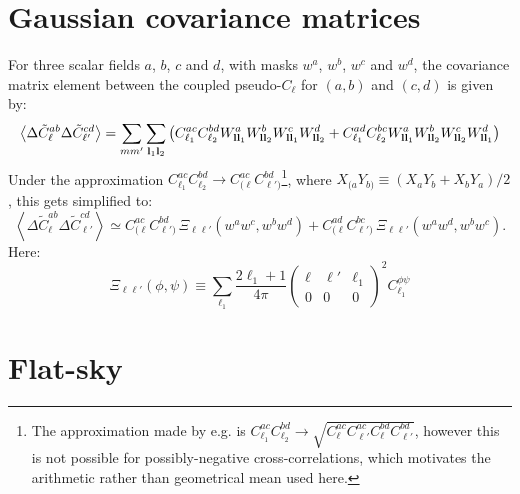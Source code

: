 \documentclass[a4paper,10pt]{article}
\newcommand{\wtj}[6]{\left(\begin{array}{ccc} #1 & #2 & #3\\#4 & #5 & #6\end{array} \right)}
\begin{document}
\section{Gaussian covariance matrices}
  For three scalar fields $a$, $b$, $c$ and $d$, with masks $w^a$, $w^b$, $w^c$ and $w^d$, the covariance matrix element between the coupled pseudo-$C_\ell$ for $(a,b)$ and $(c,d)$ is given by:
  \begin{equation}
    \left\langle\Delta\tilde{C}^{ab}_\ell\Delta\tilde{C}^{cd}_{\ell'}\right\rangle=\sum_{mm'}\sum_{{\bf l}_1{\bf l}_2}\left(C^{ac}_{\ell_1}C^{bd}_{\ell_2}W^a_{{\bf l}{\bf l}_1}W^b_{{\bf l}{\bf l}_2}W^c_{{\bf l}{\bf l}_1}W^d_{{\bf l}{\bf l}_2}+C^{ad}_{\ell_1}C^{bc}_{\ell_2}W^a_{{\bf l}{\bf l}_1}W^b_{{\bf l}{\bf l}_2}W^c_{{\bf l}{\bf l}_2}W^d_{{\bf l}{\bf l}_1}\right)
  \end{equation}
  Under the approximation $C^{ac}_{\ell_1}C^{bd}_{\ell_2}\rightarrow C^{ac}_{(\ell}C^{bd}_{\ell')}$\footnote{The approximation made by e.g. \cite{2004MNRAS.349..603E,2005MNRAS.360.1262B} is $C^{ac}_{\ell_1}C^{bd}_{\ell_2}\rightarrow \sqrt{C^{ac}_{\ell}C^{ac}_{\ell'}C^{bd}_{\ell}C^{bd}_{\ell'}}$, however this is not possible for possibly-negative cross-correlations, which motivates the arithmetic rather than geometrical mean used here.}, where $X_{(a}Y_{b)}\equiv(X_aY_b+X_bY_a)/2$, this gets simplified to:
  \begin{equation}
    \left\langle\Delta\tilde{C}^{ab}_\ell\Delta\tilde{C}^{cd}_{\ell'}\right\rangle\simeq
    C^{ac}_{(\ell}C^{bd}_{\ell')}\,\Xi_{\ell\ell'}(w^aw^c,w^bw^d)+C^{ad}_{(\ell}C^{bc}_{\ell')}\,\Xi_{\ell\ell'}(w^aw^d,w^bw^c).
  \end{equation}
  Here:
  \begin{equation}
    \Xi_{\ell\ell'}(\phi,\psi)\equiv\sum_{\ell_1}\frac{2\ell_1+1}{4\pi}\wtj{\ell}{\ell'}{\ell_1}{0}{0}{0}^2C^{\phi\psi}_{\ell_1}
  \end{equation}



\section{Flat-sky}
\end{document}

